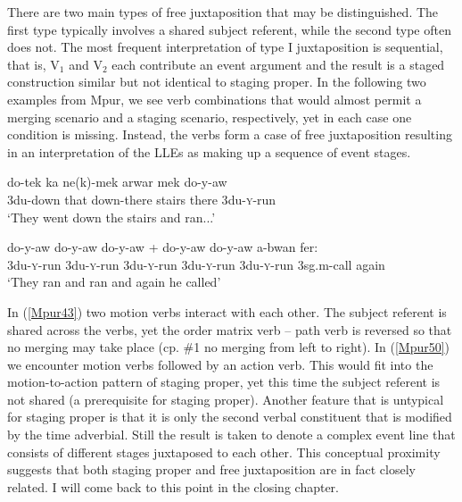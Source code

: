 There are two main types of free juxtaposition that may be distinguished. The first type typically involves a shared subject referent, while the second type often does not. The most frequent interpretation of type I juxtaposition is sequential, that is, V$_1$ and V$_2$ each contribute an event argument and the result is a staged construction similar but not identical to staging proper. In the following two examples from Mpur, we see verb combinations that would almost permit a merging scenario and a staging scenario, respectively, yet in each case one condition is missing. Instead, the verbs form a case of free juxtaposition resulting in an interpretation of the LLEs as making up a sequence of event stages.

\ea \label{Mpur43} 
\gll do-tek ka ne(k)-mek arwar mek do-y-aw \\
3\acs{du}-down that down-there stairs there 3\acs{du}-\textsc{y}-run \\
\glft `They went down the stairs and ran...' \ 
\z

\xe
\ea \label{Mpur50}
\gll do-y-aw do-y-aw do-y-aw + do-y-aw do-y-aw a-bwan fer: \\
3\acs{du}-\textsc{y}-run 3\acs{du}-\textsc{y}-run 3\acs{du}-\textsc{y}-run 3\acs{du}-\textsc{y}-run 3\acs{du}-\textsc{y}-run 3\acs{sg}.\acs{m}-call again \\
\glft `They ran and ran and again he called' \trailingcitation{{\small (Odé 2002: 97)}}\ 
\z
\xe

In (\ref{Mpur43}) two motion verbs interact with each other. The subject referent is shared across the verbs, yet the order matrix verb -- path verb is reversed so that no merging may take place (cp. \#1 no merging from left to right). In (\ref{Mpur50}) we encounter motion verbs followed by an action verb. This would fit into the motion-to-action pattern of staging proper, yet this time the subject referent is not shared (a prerequisite for staging proper). Another feature that is untypical for staging proper is that it is only the second verbal constituent that is modified by the time adverbial. Still the result is taken to denote a complex event line that consists of different stages juxtaposed to each other. This conceptual proximity suggests that both staging proper and free juxtaposition are in fact closely related. I will come back to this point in the closing chapter.

